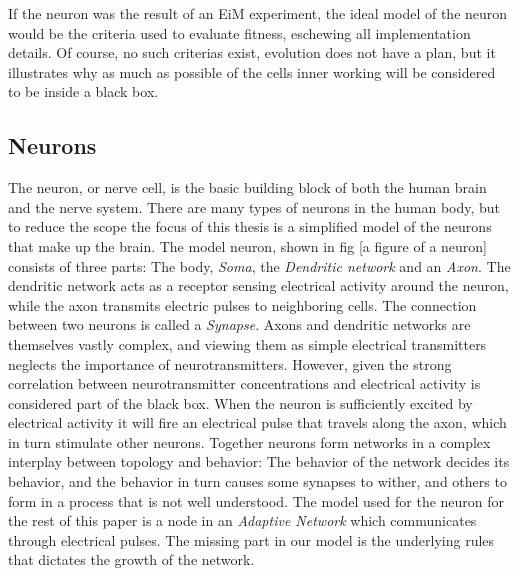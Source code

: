 If the neuron was the result of an EiM experiment, the ideal model of the neuron
would be the criteria used to evaluate fitness, eschewing all implementation
details.
Of course, no such criterias exist, evolution does not have a plan, but it
illustrates why as much as possible of the cells inner working will be
considered to be inside a black box.


\subsection{Neurons}
The neuron, or nerve cell, is the basic building block of both the human brain
and the nerve system.
There are many types of neurons in the human body, but to reduce the scope the
focus of this thesis is a simplified model of the neurons that make up the
brain.
The model neuron, shown in fig [a figure of a neuron] consists of three parts:
The body, \emph{Soma}, the \emph{Dendritic network} and an \emph{Axon}.
The dendritic network acts as a receptor sensing electrical activity around the
neuron, while the axon transmits electric pulses to neighboring cells.
The connection between two neurons is called a \emph{Synapse}.
Axons and dendritic networks are themselves vastly complex, and viewing them as
simple electrical transmitters neglects the importance of neurotransmitters.
However, given the strong correlation between neurotransmitter concentrations and
electrical activity is considered part of the black box.
When the neuron is sufficiently excited by electrical activity it will fire an
electrical pulse that travels along the axon, which in turn stimulate other
neurons.
Together neurons form networks in a complex interplay between topology and behavior:
The behavior of the network decides its behavior, and the behavior in turn
causes some synapses to wither, and others to form in a process that is not well
understood.
The model used for the neuron for the rest of this paper is a node in an
\emph{Adaptive Network} which communicates through electrical pulses.
The missing part in our model is the underlying rules that dictates the growth
of the network.
